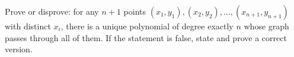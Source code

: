 Prove or disprove: for any $n+1$ points $(x_1,y_1),(x_2,y_2),\dots,(x_{n+1},y_{n+1})$ with distinct $x_i$, there is a unique polynomial of degree exactly $n$ whose graph passes through all of them. If the statement is false, state and prove a correct version.
